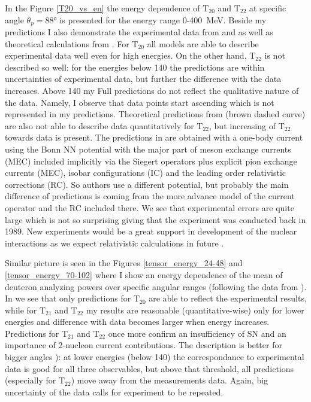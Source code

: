     In the Figure \ref{T20_vs_en} the energy dependence of $\text{T}_{20}$ and $\text{T}_{22}$
    at specific angle $\theta_p = \ang{88}$
    is presented for the energy range 0-400~MeV. Beside my predictions I also demonstrate the experimental data from
    \cite{rachek2007} and \cite{mishev1993} as well as theoretical calculations from \cite{Schmitt1989}.
    For $\text{T}_{20}$ all models are able to describe experimental data well even for
    high energies. On the other hand, $\text{T}_{22}$ is not described so well: for the 
    energies below \SI{140}{\mev} the predictions are within uncertainties of experimental data,
    but further the difference with the data increases. Above \SI{140}{\mev}
    my Full predictions do not  
    reflect the qualitative nature of the data. Namely, I observe that
    data points start ascending which is not represented in my predictions.
    Theoretical predictions from \cite{Schmitt1989} (brown dashed curve) are also not able
    to describe data quantitatively for $\text{T}_{22}$, but increasing of T$_{22}$
    towards data is present. The predictions in \cite{Schmitt1989}
    are obtained with a one-body current using the Bonn 
    NN potential with the major part of meson exchange
    currents (MEC) included implicitly via the Siegert operators plus explicit
    pion exchange currents (MEC), isobar configurations
    (IC) and the leading order relativistic corrections
    (RC). So authors use a different potential, but
    probably the main difference of predictions is coming from the
    more advance model of the current operator
    and the RC included there.
    We see that experimental errors are quite large which is not so surprising
    giving that the experiment was conducted back in 1989.
    New experiments would be a great support in development of the nuclear interactions
    as we expect relativistic calculations in future \cite{Grassi2023}.

    Similar picture is seen in the Figures \ref{tensor_energy_24-48} and \ref{tensor_energy_70-102}
    where I show an energy dependence of the mean of deuteron analyzing powers over 
    specific angular ranges (following the data from \cite{rachek2007}).
    In  we see that only predictions for $\text{T}_{20}$
    are able to reflect the experimental results,
    while for $\text{T}_{21}$ and $\text{T}_{22}$ my results are reasonable (quantitative-wise) 
    only for lower energies and difference with data becomes larger
    when energy increases. Predictions for $\text{T}_{21}$ and $\text{T}_{22}$ once more 
    confirm an insufficiency of SN and an importance of
    2-nucleon current contributions.
    The description is better for bigger angles ):
    at lower energies (below \SI{140}{\mev}) the correspondance to
    experimental data is good for all three observables, but above that 
    threshold, all predictions (especially for $\text{T}_{22}$)
    move away from the measurements data.
    Again, big uncertainty of the data calls for experiment to be repeated.
    

